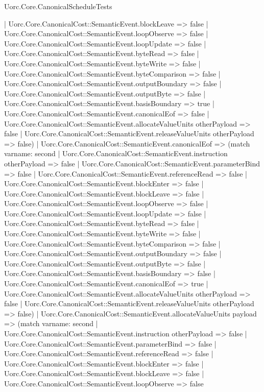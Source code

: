 \begin{lexlean}{Uorc.Core.CanonicalScheduleTests}
\begin{semanticmodule}
{      | Uorc.Core.CanonicalCost::SemanticEvent.blockLeave => false
      | Uorc.Core.CanonicalCost::SemanticEvent.loopObserve => false
      | Uorc.Core.CanonicalCost::SemanticEvent.loopUpdate => false
      | Uorc.Core.CanonicalCost::SemanticEvent.byteRead => false
      | Uorc.Core.CanonicalCost::SemanticEvent.byteWrite => false
      | Uorc.Core.CanonicalCost::SemanticEvent.byteComparison => false
      | Uorc.Core.CanonicalCost::SemanticEvent.outputBoundary => false
      | Uorc.Core.CanonicalCost::SemanticEvent.outputByte => false
      | Uorc.Core.CanonicalCost::SemanticEvent.basisBoundary => true
      | Uorc.Core.CanonicalCost::SemanticEvent.canonicalEof => false
      | Uorc.Core.CanonicalCost::SemanticEvent.allocateValueUnits otherPayload => false
      | Uorc.Core.CanonicalCost::SemanticEvent.releaseValueUnits otherPayload => false)
    | Uorc.Core.CanonicalCost::SemanticEvent.canonicalEof => (match var{name: second}
      | Uorc.Core.CanonicalCost::SemanticEvent.instruction otherPayload => false
      | Uorc.Core.CanonicalCost::SemanticEvent.parameterBind => false
      | Uorc.Core.CanonicalCost::SemanticEvent.referenceRead => false
      | Uorc.Core.CanonicalCost::SemanticEvent.blockEnter => false
      | Uorc.Core.CanonicalCost::SemanticEvent.blockLeave => false
      | Uorc.Core.CanonicalCost::SemanticEvent.loopObserve => false
      | Uorc.Core.CanonicalCost::SemanticEvent.loopUpdate => false
      | Uorc.Core.CanonicalCost::SemanticEvent.byteRead => false
      | Uorc.Core.CanonicalCost::SemanticEvent.byteWrite => false
      | Uorc.Core.CanonicalCost::SemanticEvent.byteComparison => false
      | Uorc.Core.CanonicalCost::SemanticEvent.outputBoundary => false
      | Uorc.Core.CanonicalCost::SemanticEvent.outputByte => false
      | Uorc.Core.CanonicalCost::SemanticEvent.basisBoundary => false
      | Uorc.Core.CanonicalCost::SemanticEvent.canonicalEof => true
      | Uorc.Core.CanonicalCost::SemanticEvent.allocateValueUnits otherPayload => false
      | Uorc.Core.CanonicalCost::SemanticEvent.releaseValueUnits otherPayload => false)
    | Uorc.Core.CanonicalCost::SemanticEvent.allocateValueUnits payload => (match var{name: second}
      | Uorc.Core.CanonicalCost::SemanticEvent.instruction otherPayload => false
      | Uorc.Core.CanonicalCost::SemanticEvent.parameterBind => false
      | Uorc.Core.CanonicalCost::SemanticEvent.referenceRead => false
      | Uorc.Core.CanonicalCost::SemanticEvent.blockEnter => false
      | Uorc.Core.CanonicalCost::SemanticEvent.blockLeave => false
      | Uorc.Core.CanonicalCost::SemanticEvent.loopObserve => false
}
\end{semanticmodule}
\end{lexlean}
